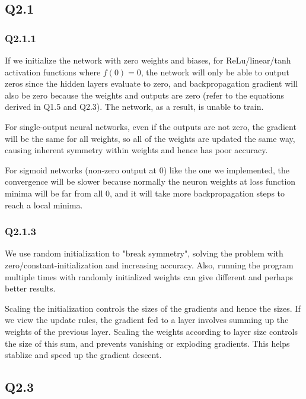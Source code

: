 \documentclass{article} %
\begin{document}
    \subsection*{Q2.1}

    \subsubsection*{Q2.1.1}

    If we initialize the network with zero weights and biases, for ReLu/linear/tanh activation functions where $f(0)=0$, the network will only be able to output zeros since the hidden layers evaluate to zero, and backpropagation gradient will also be zero because the weights and outputs are zero (refer to the equations derived in Q1.5 and Q2.3). The network, as a result, is unable to train.
    \medskip

    For single-output neural networks, even if the outputs are not zero, the gradient will be the same for all weights, so all of the weights are updated the same way, causing inherent symmetry within weights and hence has poor accuracy.
    \medskip

    For sigmoid networks (non-zero output at 0) like the one we implemented, the convergence will be slower because normally the neuron weights at loss function minima will be far from all 0, and it will take more backpropagation steps to reach a local minima.

    \subsubsection*{Q2.1.3}

    We use random initialization to "break symmetry", solving the problem with zero/constant-initialization and increasing accuracy. Also, running the program multiple times with randomly initialized weights can give different and perhaps better results.
    \medskip
    
    Scaling the initialization controls the sizes of the gradients and hence the sizes. If we view the update rules, the gradient fed to a layer involves summing up the weights of the previous layer. Scaling the weights according to layer size controls the size of this sum, and prevents vanishing or exploding gradients. This helps stablize and speed up the gradient descent.

    \subsection*{Q2.3}
\end{document}
